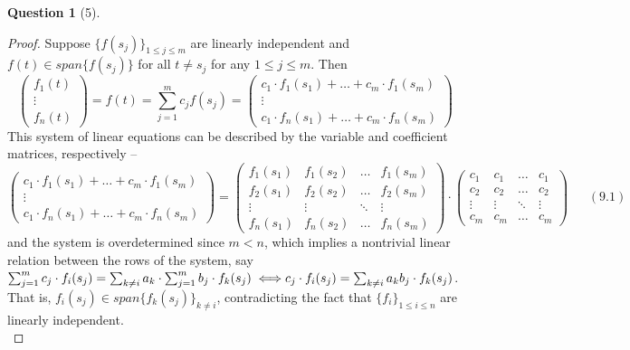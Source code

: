 \documentclass[11pt]{article}
\theoremstyle{quest}
\newtheorem*{question}{Question}
\begin{document}
\begin{question}[5]
\end{question}
\begin{proof}
Suppose $\{f(s_j)\}_{1 \le j \le m}$ are linearly independent and $f(t) \in span\{f(s_j)\}$ for all $t \ne s_j$ for any $1 \le j \le m$. Then
$$\begin{pmatrix}
f_1(t) \\
\vdots \\
f_n(t)
\end{pmatrix} = f(t) = \sum_{j=1}^m c_j f(s_j) = \begin{pmatrix}
c_1 \cdot f_1(s_1) + \ldots + c_m \cdot f_1(s_m) \\
\vdots \\
c_1 \cdot f_n(s_1) + \ldots + c_m \cdot f_n(s_m)
\end{pmatrix}$$
This system of linear equations can be described by the variable and coefficient matrices, respectively -- 
$$\begin{pmatrix}
c_1 \cdot f_1(s_1) + \ldots + c_m \cdot f_1(s_m) \\
\vdots \\
c_1 \cdot f_n(s_1) + \ldots + c_m \cdot f_n(s_m)
\end{pmatrix} = \begin{pmatrix}
f_1(s_1) & f_1(s_2) & \ldots & f_1(s_m) \\
f_2(s_1) & f_2(s_2) & \ldots & f_2(s_m) \\
\vdots & \vdots & \ddots & \vdots \\
f_n(s_1) & f_n(s_2) & \ldots & f_n(s_m)
\end{pmatrix} \cdot \begin{pmatrix} c_1 & c_1 & \ldots & c_1 \\
c_2 & c_2 & \ldots & c_2 \\
\vdots & \vdots & \ddots & \vdots \\
c_m & c_m & \ldots & c_m
\end{pmatrix}\ \ \ \ \ \ \ (9.1)$$
and the system is overdetermined since $m < n$, 
which implies a nontrivial linear relation between the rows of the system, say $\sum_{j=1}^m c_j \cdot f_i(s_j) = \sum_{k \ne i} a_k \cdot \sum_{j=1}^m b_j \cdot f_k(s_j) \iff \\c_j \cdot f_i(s_j) = \sum_{k \ne i} a_kb_j \cdot f_k(s_j)$. That is, $f_i(s_j) \in span\{f_k(s_j)\}_{k \ne i}$, contradicting the fact that $\{f_i\}_{1 \le i \le n}$ are linearly independent.
\\
\end{proof}
\end{document}
